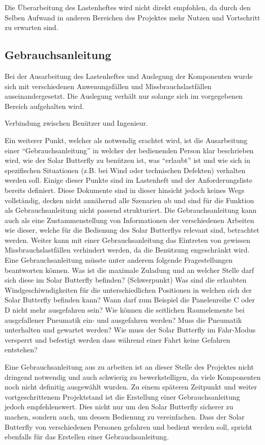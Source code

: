 Die Überarbeitung des Lastenheftes wird nicht direkt empfohlen, da durch den Selben Aufwand in anderen Bereichen des Projektes mehr Nutzen und Vortschritt zu erwarten sind.

\subsection{Gebrauchsanleitung}
Bei der Ausarbeitung des Lastenheftes und Auslegung der Komponenten wurde sich mit verschiedenen Anwenungsfällen und Missbrauchslastfällen auseinandergesetzt.
Die Auslegung verhält nur solange sich im vorgegebenen Bereich aufgehalten wird.

Verbindung zwischen Benützer und Ingenieur.

Ein weiterer Punkt, welcher als notwendig erachtet wird, ist die Ausarbeitung einer ``Gebrauchsanleitung'' in welcher der bedienenden Person klar beschrieben wird, wie der Solar Butterfly zu benützen ist, was ``erlaubt'' ist und wie sich in spezifischen Situationen (z.B. bei Wind oder technischen Defekten) verhalten werden soll. Einige dieser Punkte sind im Lastenheft und der Anforderungsliste bereits definiert. Diese Dokumente sind in dieser hinsicht jedoch keines Wegs vollständig, decken nicht annähernd alle Szenarien ab und sind für die Funktion als Gebrauchsanleitung nicht passend strukturiert. Die Gebrauchsanleitung kann auch als eine Zustammenstellung von Informationen der verschiedenen Arbeiten wie dieser, welche für die Bedienung des Solar Butterflys relevant sind, betrachtet werden. Weiter kann mit einer Gebrauchsanleitung das Eintreten von gewissen Missbrauchslastfällen verhindert werden, da die Benützung engeschränkt wird.\\
Eine Gebrauchsanleitung müsste unter anderem folgende Fragestellungen beantworten können.
Was ist die maximale Zuladung und an welcher Stelle darf sich diese im Solar Butterfly befinden? (Schwerpunkt)
Was sind die erlaubten Windgeschiwndigkeiten für die unterschiedlichen Positionen in welchen sich der Solar Butterfly befinden kann? Wann darf zum Beispiel die Panelenreihe C oder D nicht mehr ausgefahren sein?
Wie können die seitlichen Raumelemente bei ausgefallener Pneumatik ein- und ausgefahren werden? Muss die Pneumatik unterhalten und gewartet werden?
Wie muss der Solar Butterfly im Fahr-Modus versperrt und befestigt werden dass während einer Fahrt keine Gefahren entstehen?

Eine Gebrauchsanleitung aus zu arbeiten ist an dieser Stelle des Projektes nicht dringend notwendig und auch schwierig zu bewerkstelligen, da viele Komponenten noch nicht definitig ausgewählt wurden. Zu einem späteren Zeitpunkt und weiter vortgeschrittenem Projektstand ist die Erstellung einer Gebrauchsanleitung jedoch empfehlenswert. Dies nicht nur um den Solar Butterfly sicherer zu machen, sondern auch, um dessen Bedienung zu vereinfachen. Dass der Solar Butterfly von verschiedenen Personen gefahren und bedient werden soll, spricht ebenfalls für das Erstellen einer Gebrauchsanleitung.

